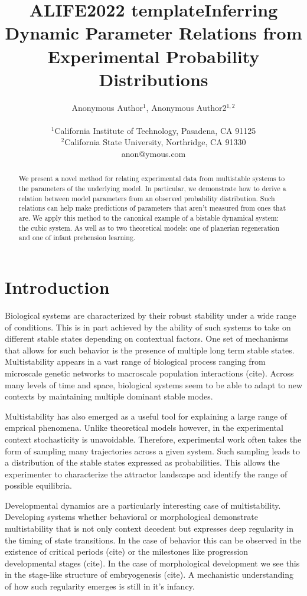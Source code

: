 \documentclass[letterpaper]{article}
\title{ALIFE2022 template}
\title{Inferring Dynamic Parameter Relations from Experimental Probability Distributions}
\author{Anonymous Author$^{1}$, Anonymous Author2$^{1,2}$ \\
\mbox{}\\
$^1$California Institute of Technology, Pasadena, CA 91125 \\
$^2$California State University, Northridge, CA 91330 \\
anon@ymous.com} %
\begin{document}
\maketitle

\begin{abstract}
    We present a novel method for relating experimental data from 
    multistable systems to the parameters of the
    underlying model. In particular, we demonstrate how to derive a 
    relation between model parameters from an observed probability
    distribution. Such relations 
    can help make predictions of parameters that aren't measured
    from ones that are. We apply this method
    to the canonical example of a bistable dynamical system: the cubic
    system.
    As well as to two theoretical models: one of planerian regeneration
    and one of infant prehension learning.
\end{abstract}

\section{Introduction}
Biological systems are characterized by their robust stability under
a wide range of conditions. This is in part achieved by the ability
of such systems to take on different stable states
depending on contextual factors. One set of mechanisms that allows for such 
behavior is the presence of multiple long term stable states. Multistability
appears in a vast range of biological process ranging from microscale
genetic networks to macroscale population interactions (cite). Across many levels 
of time and space, biological systems seem to be able to adapt to new contexts
by maintaining multiple dominant stable modes.

Multistability has also
emerged as a useful tool for  explaining a large range of emprical phenomena.
Unlike theoretical models however, in the experimental context stochasticity
is unavoidable. Therefore, experimental work often takes the form of sampling
many trajectories across a given system.
Such sampling leads to a distribution of the stable states expressed as 
probabilities. This allows the experimenter to characterize the attractor
landscape and identify the range of possible equilibria.

Developmental dynamics are a particularly interesting case of multistability. 
Developing systems whether behavioral or morphological demonstrate multistability 
that is not only context decedent but expresses deep regularity in the timing of 
state transitions. In the case of behavior this can be observed in the existence
of critical periods (cite) or the milestones like progression developmental 
stages (cite). 
In the case of morphological development we see this in the stage-like structure of
embryogenesis (cite). A mechanistic understanding of how such regularity emerges is 
still in it's infancy.
\end{document}
